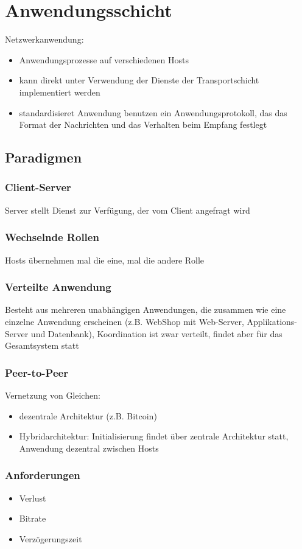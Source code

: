 \section{Anwendungsschicht}
	Netzwerkanwendung: \newline
	\begin{itemize}
  	\item Anwendungsprozesse auf verschiedenen Hosts
  	\item kann direkt unter Verwendung der Dienste der Transportschicht implementiert werden
	  \item standardisieret Anwendung benutzen ein Anwendungsprotokoll, das das Format der Nachrichten und das Verhalten beim Empfang festlegt
	\end{itemize}
	\subsection{Paradigmen}
		\subsubsection{Client-Server}
			Server stellt Dienst zur Verfügung, der vom Client angefragt wird
		\subsubsection{Wechselnde Rollen}
			Hosts übernehmen mal die eine, mal die andere Rolle
		\subsubsection{Verteilte Anwendung}
			Besteht aus mehreren unabhängigen Anwendungen, die zusammen wie eine einzelne Anwendung erscheinen (z.B. WebShop mit Web-Server, Applikations-Server und Datenbank), Koordination ist zwar verteilt, findet aber für das Gesamtsystem statt
		\subsubsection{Peer-to-Peer}
			Vernetzung von Gleichen: \newline
			\begin{itemize}
				\item dezentrale Architektur (z.B. Bitcoin)
				\item Hybridarchitektur: Initialisierung findet über zentrale Architektur statt, Anwendung dezentral zwischen Hosts
			\end{itemize}
		\subsubsection{Anforderungen}
			\begin{itemize}
				\item Verlust
				\item Bitrate
				\item Verzögerungszeit
			\end{itemize}
